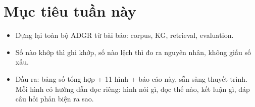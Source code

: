 \documentclass[12pt,a4paper]{article}
\begin{document}
\section{Mục tiêu tuần này}
\begin{itemize}[leftmargin=*]
\item Dựng lại toàn bộ ADGR từ bài báo: corpus, KG, retrieval, evaluation.
\item Số nào khớp thì ghi khớp, số nào lệch thì đo ra nguyên nhân, không giấu
số xấu.
\item Đầu ra: bảng số tổng hợp + 11 hình + báo cáo này, sẵn sàng thuyết trình.
Mỗi hình có hướng dẫn đọc riêng: hình nói gì, đọc thế nào, kết luận gì, đáp
câu hỏi phản biện ra sao.
\end{itemize}

\end{document}
